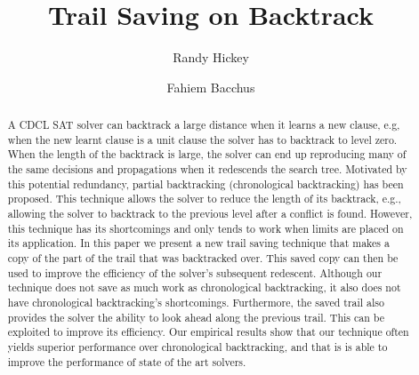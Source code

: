 \documentclass[runningheads]{llncs}
\title{Trail Saving on Backtrack}
\author{Randy Hickey \and Fahiem Bacchus}
\institute{Department of Computer Science, University of Toronto, Canada, 
  \email{rgh000@gmail.com, fbacchus@cs.toronto.edu}}
\newcommand{\sat}{SAT\xspace}
\begin{document}
\maketitle
\begin{abstract}
    A CDCL \sat solver can backtrack a large distance when it learns a
    new clause, e.g, when the new learnt clause is a unit clause the
    solver has to backtrack to level zero. When the length of the
    backtrack is large, the solver can end up reproducing many of the
    same decisions and propagations when it redescends the search
    tree. Motivated by this potential redundancy, partial backtracking
    (chronological backtracking) has been proposed. This technique
    allows the solver to reduce the length of its backtrack, e.g.,
    allowing the solver to backtrack to the previous level after a
    conflict is found. However, this technique has its shortcomings
    and only tends to work when limits are placed on its
    application. In this paper we present a new trail saving technique
    that makes a copy of the part of the trail that was backtracked
    over. This saved copy can then be used to improve the efficiency
    of the solver's subsequent redescent. Although our technique does
    not save as much work as chronological backtracking, it also does
    not have chronological backtracking's shortcomings. Furthermore,
    the saved trail also provides the solver the ability to look ahead
    along the previous trail. This can be exploited to improve its
    efficiency. Our empirical results show that our technique often
    yields superior performance over chronological backtracking, and
    that is is able to improve the performance of state of the art
    solvers.

\end{abstract}
\end{document}
